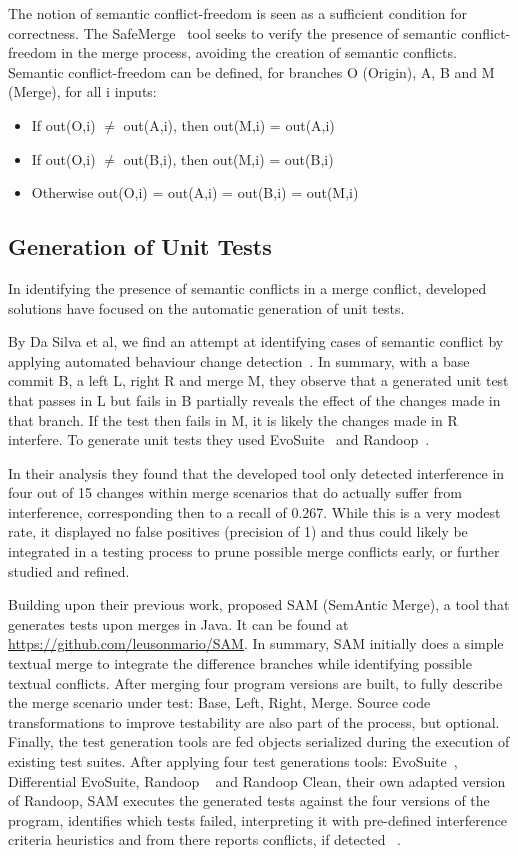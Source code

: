 The notion of semantic conflict-freedom is seen as a sufficient condition for correctness. The SafeMerge~\cite{kn:safemerge} tool seeks to verify the presence of semantic conflict-freedom in the merge process, avoiding the creation of semantic conflicts. Semantic conflict-freedom can be defined, for branches O (Origin), A, B and M (Merge), for all i inputs:
\begin{itemize}
  \item If out(O,i) $\neq$ out(A,i), then out(M,i) = out(A,i)
  \item If out(O,i) $\neq$ out(B,i), then out(M,i) = out(B,i)
  \item Otherwise out(O,i) = out(A,i) = out(B,i) = out(M,i)
\end{itemize}

\subsection{Generation of Unit Tests}

In identifying the presence of semantic conflicts in a merge conflict, developed solutions have focused on the automatic generation of unit tests.

By Da Silva et al, we find an attempt at identifying cases of semantic conflict by applying automated behaviour change detection~\cite{kn:leuson}. In summary, with a base commit B, a left L, right R and merge M, they observe that a generated unit test that passes in L but fails in B partially reveals the effect of the changes made in that branch. If the test then fails in M, it is likely the changes made in R interfere. To generate unit tests they used EvoSuite~\cite{kn:evosuite} and Randoop~\cite{kn:randoop}.

In their analysis they found that the developed tool only detected interference in four out of 15 changes within merge scenarios that do actually suffer from interference, corresponding then to a recall of 0.267. While this is a very modest rate, it displayed no false positives (precision of 1) and thus could likely be integrated in a testing process to prune possible merge conflicts early, or further studied and refined.

 Building upon their previous work, \citet{kn:leuson2} proposed SAM (SemAntic Merge), a tool that generates tests upon merges in Java. It can be found at \url{https://github.com/leusonmario/SAM}. In summary, SAM initially does a simple textual merge to integrate the difference branches while identifying possible textual conflicts. After merging four program versions are built, to fully describe the merge scenario under test: Base, Left, Right, Merge. Source code transformations to improve testability are also part of the process, but optional. Finally, the test generation tools are fed objects serialized during the execution of existing test suites. After applying four test generations tools: EvoSuite~\cite{kn:evosuite}, Differential EvoSuite, Randoop ~\cite{kn:randoop} and Randoop Clean, their own adapted version of Randoop, SAM executes the generated tests against the four versions of the program, identifies which tests failed, interpreting it with pre-defined interference criteria heuristics and from there reports conflicts, if detected ~\cite{kn:leuson2}.

